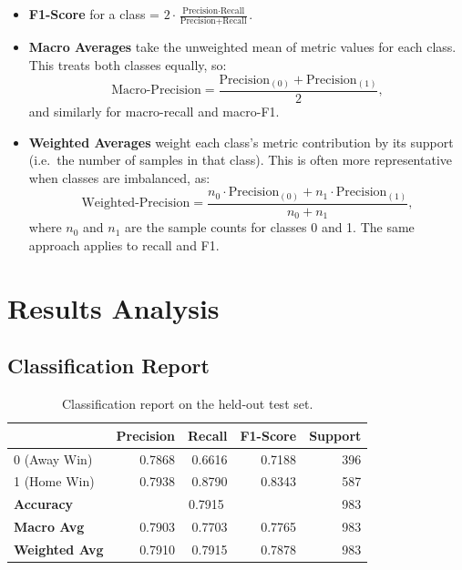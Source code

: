 \documentclass[12pt]{article}
\begin{document}
\begin{itemize}
\begin{itemize}
    \item \textbf{F1-Score} for a class = \(2 \cdot \frac{\text{Precision} \cdot \text{Recall}}{\text{Precision} + \text{Recall}}\). 
    \item \textbf{Macro Averages} take the unweighted mean of metric values for each class. This treats both classes equally, so:
      \[
        \text{Macro-Precision} = \frac{\text{Precision}_{(0)} + \text{Precision}_{(1)}}{2},
      \]
      and similarly for macro-recall and macro-F1.  
    \item \textbf{Weighted Averages} weight each class's metric contribution by its support (i.e.\ the number of samples in that class). This is often more representative when classes are imbalanced, as:
      \[
        \text{Weighted-Precision} = 
          \frac{n_0 \cdot \text{Precision}_{(0)} + n_1 \cdot \text{Precision}_{(1)}}{n_0 + n_1},
      \]
      where \(n_0\) and \(n_1\) are the sample counts for classes 0 and 1. The same approach applies to recall and F1.
  \end{itemize}
\end{itemize}




\section{Results Analysis}
\label{sec:results}

\subsection{Classification Report}
\begin{table}[H]
\centering
\begin{tabular}{lrrrr}
\toprule
   & \textbf{Precision} & \textbf{Recall} & \textbf{F1-Score} & \textbf{Support} \\
\midrule
0 (Away Win) & 0.7868 & 0.6616 & 0.7188 & 396 \\
1 (Home Win) & 0.7938 & 0.8790 & 0.8343 & 587 \\
\midrule
\textbf{Accuracy}   & \multicolumn{3}{c}{0.7915} & 983 \\
\textbf{Macro Avg}  & 0.7903 & 0.7703 & 0.7765 & 983 \\
\textbf{Weighted Avg} & 0.7910 & 0.7915 & 0.7878 & 983 \\
\bottomrule
\end{tabular}
\caption{Classification report on the held-out test set.}
\label{table:combined_conf_rep}
\end{table}
\end{document}
